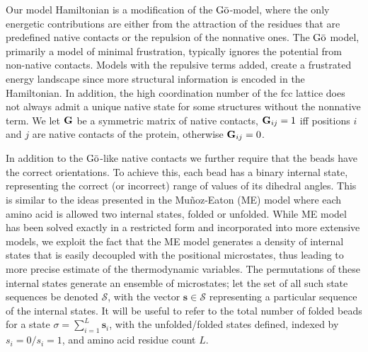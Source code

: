 Our model Hamiltonian is a modification of the $\text{G}\bar{\text{o}}$-model,\cite{abe_noninteracting_1981} where the only energetic contributions are either from the attraction of the residues that are predefined native contacts or the repulsion of the nonnative ones. The $\text{G}\bar{\text{o}}$ model, primarily a model of minimal frustration, typically ignores the potential from non-native contacts. Models with the repulsive terms added,\cite{knotts_iv_entropic_2008, hoang_molecular_2000} create a frustrated energy landscape since more structural information is encoded in the Hamiltonian. In addition, the high coordination number of the fcc lattice does not always admit a unique native state for some structures without the nonnative term. We let $\textbf{G}$ be a symmetric matrix of native contacts, $\textbf{G}_{ij}=1$ iff positions $i$ and $j$ are native contacts of the protein, otherwise $\textbf{G}_{ij}=0$.  

In addition to the $\text{G}\bar{\text{o}}$-like native contacts we further require that the beads have the correct orientations. To achieve this, each bead has a binary internal state, representing the correct (or incorrect) range of values of its dihedral angles. This is similar to the ideas presented in the Mu{\~n}oz-Eaton (ME) model\cite{munoz_simple_1999} where each amino acid is allowed two internal states, folded or unfolded. While ME model has been solved exactly in a restricted form\cite{bruscolini_exact_2002} and incorporated into more extensive models,\cite{chung_temperature-dependent_2008} we exploit the fact that the ME model generates a density of internal states that is easily decoupled with the positional microstates, thus leading to more precise estimate of the thermodynamic variables. The permutations of these internal states generate an ensemble of microstates; let the set of all such state sequences be denoted $\mathcal{S}$, with the vector $\mathbf{s} \in \mathcal{S}$ representing a particular sequence of the internal states. It will be useful to refer to the total number of folded beads for a state $\sigma = \sum_{i=1}^{L} \mathbf{s}_i$, with the unfolded/folded states defined, indexed by $s_i=0 / s_i=1 $, and amino acid residue count $L$.
 
